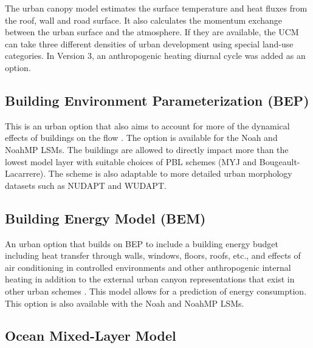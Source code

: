 The urban canopy model estimates the surface temperature and heat
fluxes from the roof, wall and road surface. It also calculates
the momentum exchange between the urban surface and the atmosphere.
If they are available, the UCM can take three different densities
of urban development using special land-use categories.
In Version 3, an anthropogenic heating diurnal cycle was added as
an option.

\subsection{Building Environment Parameterization (BEP)}

This is an urban option that also aims to account for more of the dynamical effects of buildings on the flow \citep{martilli02}.
The option is available for the Noah and NoahMP LSMs.
The buildings are allowed to directly impact more than the lowest model layer with suitable choices of PBL schemes (MYJ and Bougeault-Lacarrere).
The scheme is also adaptable to more detailed urban morphology datasets such as NUDAPT and WUDAPT.

\subsection{Building Energy Model (BEM)}

An urban option that builds on BEP to include a building energy budget including heat transfer through walls, windows, floors, roofs, etc., and effects of air conditioning
in controlled environments and other anthropogenic internal heating
in addition to the external urban canyon representations that exist in other urban schemes \citep{salamanca10}. This model allows for a prediction of energy consumption.
This option is also available with the Noah and NoahMP LSMs.

\subsection{Ocean Mixed-Layer Model}

